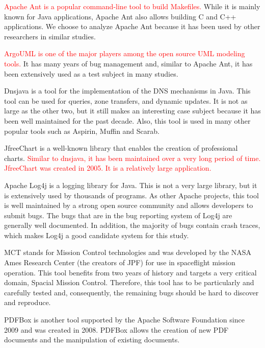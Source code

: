 \documentclass[times, doublespace]{smrauth}
\newcommand{\red}[1]{\textcolor{red}{#1}}
\begin{document}
{\red{Apache Ant \cite{ApacheSoftwareFoundation} is a popular command-line tool to build
Makefiles.} While it is mainly known for Java applications,
Apache Ant also allows building C and C++ applications. We
choose to analyze Apache Ant because it has been used by
other researchers in similar studies.

\red{ArgoUML \cite{CollabNet} is one of the major players among the open source
UML modeling tools.} It has many years of bug management
and, similar to Apache Ant, it has been extensively used as a
test subject in many studies.

Dnsjava \cite{Wellington2013} is a tool for the implementation of the DNS
mechanisms in Java. This tool can be used for queries, zone
transfers, and dynamic updates. It is not as large as the other
two, but it still makes an interesting case subject because it has
been well maintained for the past decade. Also, this tool is
used in many other popular tools such as Aspirin, Muffin and
Scarab.

JfreeChart \cite{ObjectRefineryLimited2005} is a well-known library that enables the
creation of professional charts. \red{Similar to dnsjava, it has been
maintained over a very long period of time. JfreeChart was
created in 2005. It is a relatively large application.}

Apache Log4j \cite{TheApacheSoftwareFoundation1999} is a logging library for Java.
This is not a
very large library, but it is extensively used by thousands of
programs. As other Apache projects, this tool is well
maintained by a strong open source community and allows
developers to submit bugs. The bugs that are in the bug
reporting system of Log4j are generally well
documented. In addition, the majority of bugs contain crash
traces, which makes Log4j a good candidate system for this study.

MCT \cite{NASA2009} stands for Mission Control technologies and was
developed by the NASA Ames Research Center (the creators
of JPF) for use in spaceflight mission operation. This tool
benefits from two years of history and targets a very critical
domain, Spacial Mission Control. Therefore, this tool has to
be particularly and carefully tested and, consequently, the
remaining bugs should be hard to discover and reproduce.

PDFBox \cite{ApacheSoftwareFoundation2014} is another tool supported by the Apache
Software Foundation since 2009 and was created in 2008.
PDFBox allows the creation of new PDF documents and the
manipulation of existing documents.

}
\end{document}
